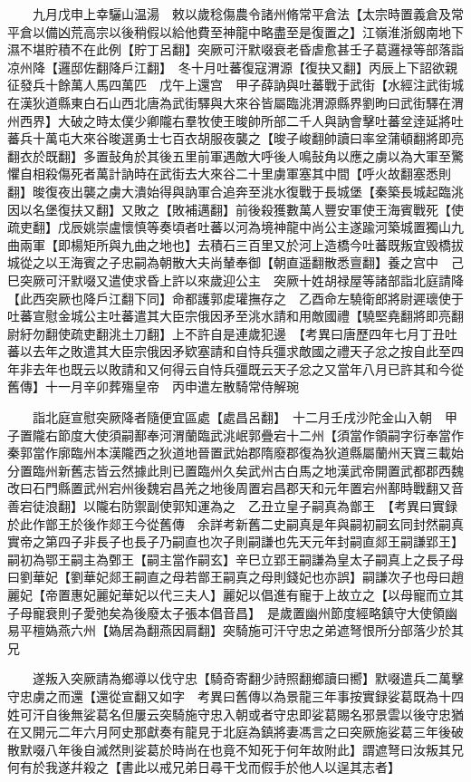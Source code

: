 　　九月戊申上幸驪山温湯　敕以歲稔傷農令諸州脩常平倉法【太宗時置義倉及常平倉以備凶荒高宗以後稍假以給他費至神龍中略盡至是復置之】江嶺淮浙劔南地下濕不堪貯積不在此例【貯丁呂翻】突厥可汗默啜衰老昏虐愈甚壬子葛邏禄等部落詣凉州降【邏邸佐翻降戶江翻】　冬十月吐蕃復寇渭源【復抉又翻】丙辰上下詔欲親征發兵十餘萬人馬四萬匹　戊午上還宫　甲子薛訥與吐蕃戰于武街【水經注武街城在漢狄道縣東白石山西北唐為武街驛與大來谷皆屬臨洮渭源縣界劉昫曰武街驛在渭州西界】大破之時太僕少卿隴右羣牧使王晙帥所部二千人與訥會擊吐蕃坌逹延將吐蕃兵十萬屯大來谷晙選勇士七百衣胡服夜襲之【晙子峻翻帥讀曰率坌蒲頓翻將即亮翻衣於既翻】多置鼔角於其後五里前軍遇敵大呼後人鳴鼔角以應之虜以為大軍至驚懼自相殺傷死者萬計訥時在武街去大來谷二十里虜軍塞其中間【呼火故翻塞悉則翻】晙復夜出襲之虜大潰始得與訥軍合追奔至洮水復戰于長城堡【秦築長城起臨洮因以名堡復扶又翻】又敗之【敗補邁翻】前後殺獲數萬人豐安軍使王海賓戰死【使疏吏翻】戊辰姚崇盧懷慎等奏頃者吐蕃以河為境神龍中尚公主遂踰河築城置獨山九曲兩軍【即楊矩所與九曲之地也】去積石三百里又於河上造橋今吐蕃既叛宜毁橋拔城從之以王海賓之子忠嗣為朝散大夫尚輦奉御【朝直遥翻散悉亶翻】養之宫中　己巳突厥可汗默啜又遣使求昏上許以來歲迎公主　突厥十姓胡禄屋等諸部詣北庭請降【此西突厥也降戶江翻下同】命都護郭䖍瓘撫存之　乙酉命左驍衛郎將尉遲瓌使于吐蕃宣慰金城公主吐蕃遣其大臣宗俄因矛至洮水請和用敵國禮【驍堅堯翻將即亮翻尉紆勿翻使疏吏翻洮土刀翻】上不許自是連歲犯邊　【考異曰唐歷四年七月丁丑吐蕃以去年之敗遣其大臣宗俄因矛欵塞請和自恃兵彊求敵國之禮天子忿之按自此至四年非去年也既云以敗請和又何得云自恃兵彊既云天子忿之又當年八月已許其和今從舊傳】十一月辛卯葬殤皇帝　丙申遣左散騎常侍解琬

　　詣北庭宣慰突厥降者隨便宜區處【處昌呂翻】　十二月壬戌沙陀金山入朝　甲子置隴右節度大使須嗣鄯奉河渭蘭臨武洮岷郭疊宕十二州【須當作領嗣字衍奉當作秦郭當作廓臨州本漢隴西之狄道地晉置武始郡隋廢郡復為狄道縣屬蘭州天寶三載始分置臨州新舊志皆云然據此則已置臨州久矣武州古白馬之地漢武帝開置武都郡西魏改曰石門縣置武州宕州後魏宕昌羌之地後周置宕昌郡天和元年置宕州鄯時戰翻又音善宕徒浪翻】以隴右防禦副使郭知運為之　乙丑立皇子嗣真為鄫王　【考異曰實録於此作鄫王於後作郯王今從舊傳　余詳考新舊二史嗣真是年與嗣初嗣玄同封然嗣真實帝之第四子非長子也長子乃嗣直也次子則嗣謙也先天元年封嗣直郯王嗣謙郢王】嗣初為鄂王嗣主為鄄王【嗣主當作嗣玄】辛巳立郢王嗣謙為皇太子嗣真上之長子母曰劉華妃【劉華妃郯王嗣直之母若鄫王嗣真之母則錢妃也亦誤】嗣謙次子也母曰趙麗妃【帝置惠妃麗妃華妃以代三夫人】麗妃以倡進有寵于上故立之【以母寵而立其子母寵衰則子愛弛矣為後廢太子張本倡音昌】　是歲置幽州節度經略鎮守大使領幽易平檀媯燕六州【媯居為翻燕因肩翻】突騎施可汗守忠之弟遮弩恨所分部落少於其兄

　　遂叛入突厥請為鄉導以伐守忠【騎奇寄翻少詩照翻鄉讀曰嚮】默啜遣兵二萬擊守忠虜之而還【還從宣翻又如字　考異曰舊傳以為景龍三年事按實録娑葛既為十四姓可汗自後無娑葛名但屢云突騎施守忠入朝或者守忠即娑葛賜名邪景雲以後守忠猶在又開元二年六月阿史那獻奏有龍見于北庭為鎮將妻馮言之曰突厥施娑葛三年後破散默啜八年後自滅然則娑葛於時尚在也竟不知死于何年故附此】謂遮弩曰汝叛其兄何有於我遂幷殺之【書此以戒兄弟日尋干戈而假手於他人以逞其志者】

